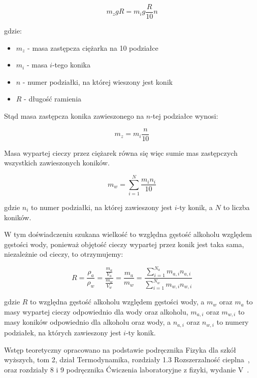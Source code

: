 \documentclass[a4paper,12pt]{article}
\begin{document}
\begin{equation*}
    m_z gR = m_i g \frac{R}{10} n
\end{equation*}

gdzie:
\begin{itemize}
    \item $m_z$ - masa zastępcza ciężarka na 10 podziałce
    \item $m_i$ - masa $i$-tego konika
    \item $n$ - numer podziałki, na której wieszony jest konik
    \item $R$ - długość ramienia
\end{itemize}

Stąd masa zastępcza konika zawieszonego na $n$-tej podziałce wynosi:

\begin{equation*}
    m_z = m_i \frac{n}{10}
\end{equation*}

Masa wypartej cieczy przez ciężarek równa się więc sumie mas zastępczych wszystkich zawieszonych koników.

\begin{equation}
    \label{eq:waga_mohra}
    m_w = \sum_{i=1}^{N} \frac{m_i n_i}{10}
\end{equation}

gdzie $n_i$ to numer podziałki, na której zawieszony jest $i$-ty konik, a $N$ to liczba koników.


W tym doświadczeniu szukana wielkość to względna gęstość alkoholu względem gęstości wody, ponieważ objętość cieczy wypartej przez konik jest taka sama, niezależnie od cieczy, to otrzymujemy:

\begin{equation}
    \label{eq:wzgledna_gestosc}
    R = \frac{\rho_a}{\rho_w} = \frac{\frac{m_a}{V_a}}{\frac{m_w}{V_w}} = \frac{m_a}{m_w} = \frac{\sum_{i=1}^{N_a} m_{a,i} n_{a,i}}{\sum_{i=1}^{N_w} m_{w,i} n_{w,i}}
\end{equation}

gdzie $R$ to względna gęstość alkoholu względem gęstości wody, a $m_w$ oraz $m_a$ to masy wypartej cieczy odpowiednio dla wody oraz alkoholu, $m_{a, i}$ oraz $m_{w, i}$ to masy koników odpowiednio dla alkoholu oraz wody, a $n_{a, i}$ oraz $n_{w, i}$ to numery podziałek, na których zawieszony jest $i$-ty konik.

Wstęp teoretyczny opracowano na podstawie podręcznika Fizyka dla szkół wyższych, tom 2, dział Termodynamika, rozdziały 1.3 Rozszerzalność cieplna~\cite{fizyka_dla_szkół_wyższych_tom_2}, oraz rozdziały 8 i 9 podręcznika Ćwiczenia laboratoryjne z fizyki, wydanie V~\cite{Drynski1976}.
\end{document}
